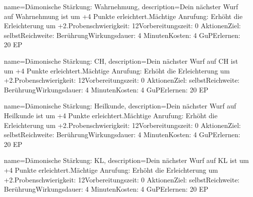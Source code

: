 {
    name={Dämonische Stärkung: Wahrnehmung},
    description={Dein nächster Wurf auf Wahrnehmung ist um +4 Punkte erleichtert.\newline Mächtige Anrufung: Erhöht die Erleichterung um +2.\newline Probenschwierigkeit: 12\newline Vorbereitungszeit: 0 Aktionen\newline Ziel: selbst\newline Reichweite: Berührung\newline Wirkungsdauer: 4 Minuten\newline Kosten: 4 GuP\newline Erlernen: 20 EP}
}


{
    name={Dämonische Stärkung: CH},
    description={Dein nächster Wurf auf CH ist um +4 Punkte erleichtert.\newline Mächtige Anrufung: Erhöht die Erleichterung um +2.\newline Probenschwierigkeit: 12\newline Vorbereitungszeit: 0 Aktionen\newline Ziel: selbst\newline Reichweite: Berührung\newline Wirkungsdauer: 4 Minuten\newline Kosten: 4 GuP\newline Erlernen: 20 EP}
}


{
    name={Dämonische Stärkung: Heilkunde},
    description={Dein nächster Wurf auf Heilkunde ist um +4 Punkte erleichtert.\newline Mächtige Anrufung: Erhöht die Erleichterung um +2.\newline Probenschwierigkeit: 12\newline Vorbereitungszeit: 0 Aktionen\newline Ziel: selbst\newline Reichweite: Berührung\newline Wirkungsdauer: 4 Minuten\newline Kosten: 4 GuP\newline Erlernen: 20 EP}
}


{
    name={Dämonische Stärkung: KL},
    description={Dein nächster Wurf auf KL ist um +4 Punkte erleichtert.\newline Mächtige Anrufung: Erhöht die Erleichterung um +2.\newline Probenschwierigkeit: 12\newline Vorbereitungszeit: 0 Aktionen\newline Ziel: selbst\newline Reichweite: Berührung\newline Wirkungsdauer: 4 Minuten\newline Kosten: 4 GuP\newline Erlernen: 20 EP}
}


